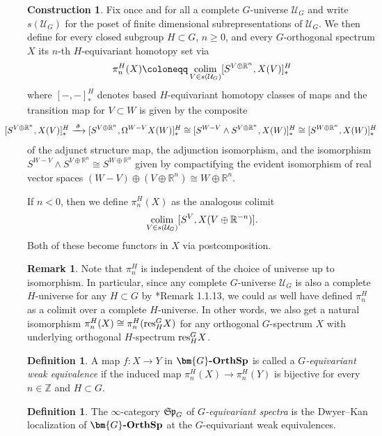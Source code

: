 \documentclass[reqno]{memo-l}
\theoremstyle{mythm}
\theoremstyle{definition}
\newtheorem{rk}[thm]{Remark}
\newtheorem{constr}[thm]{Construction}
\newtheorem{definition}[thm]{Definition}
\numberwithin{equation}{section}
\newcommand{\Uu}{{\mathcal{U}}}
\newcommand{\R} {{\mathbb{R}}}
\newcommand{\Z} {{\mathbb{Z}}}
\newcommand{\cat}[1]{\textbf{\textup{#1}}}
\newcommand{\colim}{\mathop{\textup{colim}}}
\newcommand{\res}{\textup{res}}
\let\smashp=\wedge
\newcommand{\mySp}{{\mathfrak S\kern-.5pt\mathfrak p}}
\newcommand{\Gosp}[1]{\cat{$\bm{#1}$-OrthSp}}
\begin{document}
\begin{constr}
    Fix once and for all a complete $G$-universe $\Uu_G$ and write $s(\Uu_G)$ for the poset of finite dimensional subrepresentations of $\Uu_G$. We then define for every closed subgroup $H\subset G$, $n\ge 0$, and every $G$-orthogonal spectrum $X$ its $n$-th $H$-equivariant homotopy set via
    \[
        \pi_{n}^H(X)\coloneqq\colim_{V\in s(\Uu_{G})} [S^{V\oplus\R^n},X(V)]^H_*
    \]
    where $[-{,}-]_*^H$ denotes based $H$-equivariant homotopy classes of maps and the transition map for $V\subset W$ is given by the composite
    \[\hskip-26.05pt\hfuzz=26.05pt
        [S^{V\oplus\R^n},X(V)]_*^H\xrightarrow{\;\tilde\sigma\;}[S^{V\oplus\R^n},\Omega^{W-V}X(W)]_*^H\cong[S^{W-V}\smashp S^{V\oplus\R^n},X(W)]_*^H\cong[S^{W\oplus\R^n},X(W)]_*^H
    \]
    of the adjunct structure map, the adjunction isomorphism, and the isomorphism $S^{W-V}\smashp S^{V\oplus\R^n}\cong S^{W\oplus\R^n}$ given by compactifying the evident isomorphism of real vector spaces $(W-V)\oplus (V\oplus\R^n)\cong W\oplus\R^n$.

    If $n<0$, then we define $\pi_n^H(X)$ as the analogous colimit
    \[
        \colim_{V\in s(\Uu_G)}[S^V,X(V\oplus\R^{-n})].
    \]
    Both of these become functors in $X$ via postcomposition.
\end{constr}

\begin{rk}\label{rk:universe-subgroup}
    Note that $\pi_n^H$ is independent of the choice of universe up to isomorphism. In particular, since any complete $G$-universe $\Uu_G$ is also a complete $H$-universe for any $H\subset G$ by \cite{schwede2018global}*{Remark 1.1.13}, we could as well have defined $\pi_n^H$ as a colimit over a complete $H$-universe. In other words, we also get a natural isomorphism $\pi_n^H(X)\cong\pi_n^H(\res^G_HX)$ for any orthogonal $G$-spectrum $X$ with underlying orthogonal $H$-spectrum $\res^G_HX$.
\end{rk}

\begin{definition}
    A map $f\colon X\to Y$ in $\Gosp{G}$ is called a \emph{$G$-equivariant weak equivalence} if the induced map $\pi_n^H(X)\to\pi_n^H(Y)$ is bijective for every $n\in\Z$ and $H\subset G$. 
\end{definition}

\begin{definition}
    The $\infty$-category $\mySp_G$ of \emph{$G$-equivariant spectra} is the Dwyer--Kan localization of $\Gosp{G}$ at the $G$-equivariant weak equivalences.
\end{definition}
\end{document}
